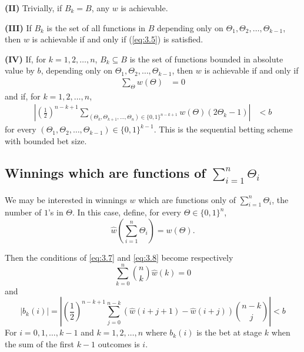 \documentclass[11pt]{article}
\numberwithin{equation}{section}
\theoremstyle{boldStyle}
\begin{document}
\begin{boxA}
    \textbf{(II)} Trivially, if $B_k = B$, any $w$ is achievable.
\end{boxA}

\begin{boxA}
    \textbf{(III)} If $B_k$ is the set of all functions in $B$ depending only on $\Theta_1, \Theta_2, \ldots, \Theta_{k-1}$, 
    then $w$ is achievable if and only if (\ref{eq:3.5}) is satisfied.
\end{boxA}

\begin{boxA}
    \textbf{(IV)} If, for $k = 1, 2, \ldots, n$, $B_k \subseteq B$ is the set of functions bounded in absolute value by $b$, depending only on $\Theta_1, \Theta_2, \ldots, \Theta_{k-1}$, 
    then $w$ is achievable if and only if
    \begin{align} \label{eq:3.7}
        \sum_{\Theta} w(\Theta) &= 0 
    \end{align}
    and if, for $k = 1, 2, \ldots, n$,
    \begin{align} \label{eq:3.8}
        \left|\left(\frac{1}{2}\right)^{n-k+1} \sum_{(\Theta_k, \Theta_{k+1}, \ldots, \Theta_n) \in \{0,1\}^{n-k+1}} w(\Theta)(2\Theta_k - 1)\right| &< b 
    \end{align}
    for every $(\Theta_1, \Theta_2, \ldots, \Theta_{k-1}) \in \{0, 1\}^{k-1}$. This is the sequential betting scheme with bounded bet size.
\end{boxA}




\subsection{Winnings which are functions of $\sum_{i=1}^{n} \Theta_i$}


We may be interested in winnings $w$ which are functions only of $\sum_{i=1}^n \Theta_i$, the number of $1$'s in $\Theta$. In this case, define, for every $\Theta \in \{0, 1\}^n$,
\begin{equation} \label{eq:3.9}
    \hat{w} \left(\sum_{i=1}^n \Theta_i\right) = w(\Theta).
\end{equation}

Then the conditions of \ref{eq:3.7} and \ref{eq:3.8} become respectively
\begin{equation} \label{eq:3.10}
    \sum_{k=0}^n \binom{n}{k} \hat{w}(k) = 0
\end{equation}
and
\begin{equation} \label{eq:3.11}
    \left|b_k(i)\right| = \left|\left(\frac{1}{2}\right)^{n-k+1} \sum_{j=0}^{n-k} \left(\hat{w}(i+j+1) - \hat{w}(i+j)\right) \binom{n-k}{j}\right| < b
\end{equation}
For \(i = 0, 1, \ldots, k - 1\) and \(k = 1, 2, \ldots, n\) where
$b_k(i)$ is the bet at stage \(k\) when the sum of the first \(k - 1\) outcomes is \(i\).
\end{document}
